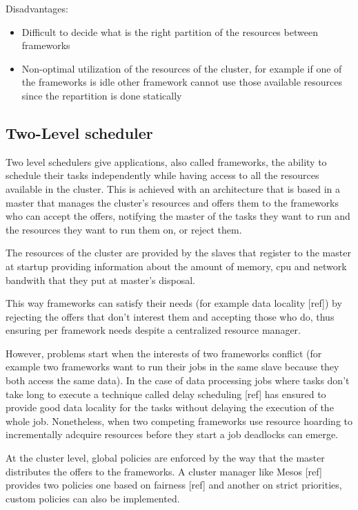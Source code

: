 \documentclass{svjour3}                     %
\begin{document}
Disadvantages:

\begin{itemize}
  \item Difficult to decide what is the right partition of the resources
between frameworks
  \item Non-optimal utilization of the resources of the cluster, for example
if one of the frameworks is idle other framework cannot use those
available resources since the repartition is done statically
\end{itemize}

\subsection{Two-Level scheduler}

Two level schedulers give applications, also called
frameworks, the ability to schedule their tasks independently while
having access to all the resources available in the cluster. This
is achieved with an architecture that is based in a master that manages
the cluster's resources and offers them to the frameworks who can accept 
the offers, notifying the master of the tasks they want to run and the
resources they want to run them on, or reject them.

The resources of the cluster are provided by the slaves that register to 
the master at startup providing information about the amount of memory, cpu
and network bandwith that they put at master's disposal.  

This way frameworks can satisfy their needs (for example data locality [ref]) by 
rejecting the offers that don't interest them and accepting those who do, thus
ensuring per framework needs despite a centralized resource manager. 

However, problems start when the interests of two frameworks conflict 
(for example two frameworks want to run their jobs in the same slave because 
they both access the same data). In the case of data processing jobs where tasks
don't take long to execute a technique called delay scheduling [ref] has ensured to
provide good data locality for the tasks without delaying the execution of the whole
job. Nonetheless, when two competing frameworks use resource hoarding to incrementally 
adcquire resources before they start a job deadlocks can emerge.

At the cluster level, global policies are enforced by the way that the master 
distributes the offers to the frameworks. A cluster manager like Mesos [ref] provides two
policies one based on fairness [ref] and another on strict priorities, custom policies can
also be implemented.
\end{document}
